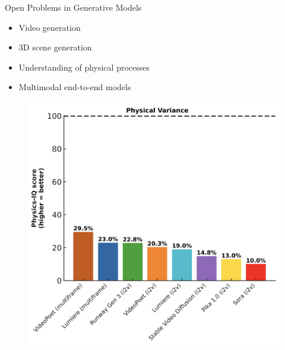 \documentclass{beamer}
\begin{document}
\begin{frame}{Open Problems in Generative Models}
	\begin{itemize}
		\item Video generation
		\item 3D scene generation
		\item Understanding of physical processes
		\item Multimodal end-to-end models
	\end{itemize}	
	\begin{figure}
		\includegraphics[width=0.55\linewidth]{figs/physics_understand}
	\end{figure}
\end{frame}
\end{document}
